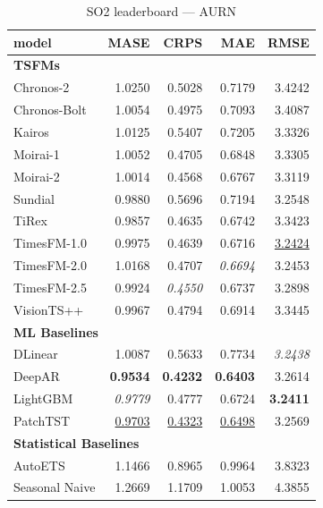 \begin{table}[H]
\caption{SO2 leaderboard --- AURN}
\centering
\begin{small}
\begin{tabular}{lrrrr}
\toprule
model & MASE & CRPS & MAE & RMSE \\
\midrule
\multicolumn{5}{l}{\textbf{TSFMs}} \\
Chronos-2 & 1.0250 & 0.5028 & 0.7179 & 3.4242 \\
Chronos-Bolt & 1.0054 & 0.4975 & 0.7093 & 3.4087 \\
Kairos & 1.0125 & 0.5407 & 0.7205 & 3.3326 \\
Moirai-1 & 1.0052 & 0.4705 & 0.6848 & 3.3305 \\
Moirai-2 & 1.0014 & 0.4568 & 0.6767 & 3.3119 \\
Sundial & 0.9880 & 0.5696 & 0.7194 & 3.2548 \\
TiRex & 0.9857 & 0.4635 & 0.6742 & 3.3423 \\
TimesFM-1.0 & 0.9975 & 0.4639 & 0.6716 & \underline{3.2424} \\
TimesFM-2.0 & 1.0168 & 0.4707 & \textit{0.6694} & 3.2453 \\
TimesFM-2.5 & 0.9924 & \textit{0.4550} & 0.6737 & 3.2898 \\
VisionTS++ & 0.9967 & 0.4794 & 0.6914 & 3.3445 \\
\midrule
\multicolumn{5}{l}{\textbf{ML Baselines}} \\
DLinear & 1.0087 & 0.5633 & 0.7734 & \textit{3.2438} \\
DeepAR & \textbf{0.9534} & \textbf{0.4232} & \textbf{0.6403} & 3.2614 \\
LightGBM & \textit{0.9779} & 0.4777 & 0.6724 & \textbf{3.2411} \\
PatchTST & \underline{0.9703} & \underline{0.4323} & \underline{0.6498} & 3.2569 \\
\midrule
\multicolumn{5}{l}{\textbf{Statistical Baselines}} \\
AutoETS & 1.1466 & 0.8965 & 0.9964 & 3.8323 \\
Seasonal Naive & 1.2669 & 1.1709 & 1.0053 & 4.3855 \\
\bottomrule
\end{tabular}
\end{small}
\end{table}